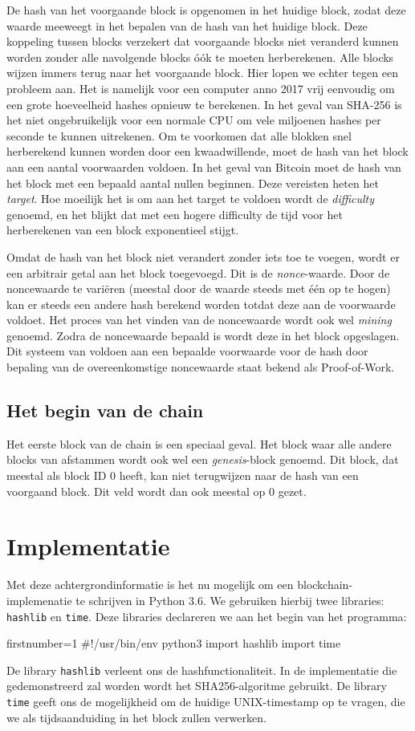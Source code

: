 \documentclass{article}
\begin{document}
De hash van het voorgaande block is opgenomen in het huidige block, zodat deze waarde meeweegt in het bepalen van de hash van het huidige block. Deze koppeling tussen blocks verzekert dat voorgaande blocks niet veranderd kunnen worden zonder alle navolgende blocks óók te moeten herberekenen. Alle blocks wijzen immers terug naar het voorgaande block. Hier lopen we echter tegen een probleem aan. Het is namelijk voor een computer anno 2017 vrij eenvoudig om een grote hoeveelheid hashes opnieuw te berekenen. In het geval van SHA-256 is het niet ongebruikelijk voor een normale CPU om vele miljoenen hashes per seconde te kunnen uitrekenen. Om te voorkomen dat alle blokken snel herberekend kunnen worden door een kwaadwillende, moet de hash van het block aan een aantal voorwaarden voldoen. In het geval van Bitcoin moet de hash van het block met een bepaald aantal nullen beginnen. Deze vereisten heten het \textit{target}. Hoe moeilijk het is om aan het target te voldoen wordt de \textit{difficulty} genoemd, en het blijkt dat met een hogere difficulty de tijd voor het herberekenen van een block exponentieel stijgt.

Omdat de hash van het block niet verandert zonder iets toe te voegen, wordt er een arbitrair getal aan het block toegevoegd. Dit is de \textit{nonce}-waarde. Door de noncewaarde te variëren (meestal door de waarde steeds met één op te hogen) kan er steeds een andere hash berekend worden totdat deze aan de voorwaarde voldoet. Het proces van het vinden van de noncewaarde wordt ook wel \textit{mining} genoemd. Zodra de noncewaarde bepaald is wordt deze in het block opgeslagen. Dit systeem van voldoen aan een bepaalde voorwaarde voor de hash door bepaling van de overeenkomstige noncewaarde staat bekend als Proof-of-Work.

\subsection{Het begin van de chain}
Het eerste block van de chain is een speciaal geval. Het block waar alle andere blocks van afstammen wordt ook wel een \textit{genesis}-block genoemd. Dit block, dat meestal als block ID 0 heeft, kan niet terugwijzen naar de hash van een voorgaand block. Dit veld wordt dan ook meestal op 0 gezet.

\section{Implementatie}
Met deze achtergrondinformatie is het nu mogelijk om een blockchain-implemenatie te schrijven in Python 3.6. We gebruiken hierbij twee libraries: \texttt{hashlib} en \texttt{time}. Deze libraries declareren we aan het begin van het programma:
\begin{python3code*}{firstnumber=1}
#!/usr/bin/env python3
import hashlib
import time


\end{python3code*}
De library \texttt{hashlib} verleent ons de hashfunctionaliteit. In de implementatie die gedemonstreerd zal worden wordt het SHA256-algoritme gebruikt. De library \texttt{time} geeft ons de mogelijkheid om de huidige UNIX-timestamp op te vragen, die we als tijdsaanduiding in het block zullen verwerken.
\end{document}
